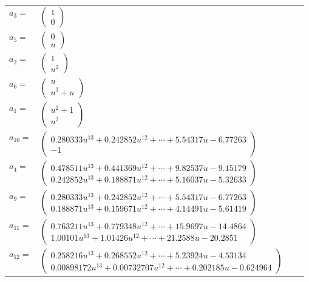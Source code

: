 \documentclass[1p]{elsarticle_modified}
\theoremstyle{definition}
\begin{document}
\begin{tabular}{m{7pt} m{180pt} m{7pt} m{180pt} }
\flushright $a_{3}=$&$\begin{pmatrix}1\\0\end{pmatrix}$ \\
\flushright $a_{5}=$&$\begin{pmatrix}0\\u\end{pmatrix}$ \\
\flushright $a_{2}=$&$\begin{pmatrix}1\\u^2\end{pmatrix}$ \\
\flushright $a_{6}=$&$\begin{pmatrix}u\\u^3+u\end{pmatrix}$ \\
\flushright $a_{1}=$&$\begin{pmatrix}u^2+1\\u^2\end{pmatrix}$ \\
\flushright $a_{10}=$&$\begin{pmatrix}0.280333 u^{13}+0.242852 u^{12}+\cdots+5.54317 u-6.77263\\-1\end{pmatrix}$ \\
\flushright $a_{4}=$&$\begin{pmatrix}0.478511 u^{13}+0.441369 u^{12}+\cdots+9.82537 u-9.15179\\0.242852 u^{13}+0.188871 u^{12}+\cdots+5.16037 u-5.32633\end{pmatrix}$ \\
\flushright $a_{9}=$&$\begin{pmatrix}0.280333 u^{13}+0.242852 u^{12}+\cdots+5.54317 u-6.77263\\0.188871 u^{13}+0.159671 u^{12}+\cdots+4.14491 u-5.61419\end{pmatrix}$ \\
\flushright $a_{11}=$&$\begin{pmatrix}0.763211 u^{13}+0.779348 u^{12}+\cdots+15.9697 u-14.4864\\1.00101 u^{13}+1.01426 u^{12}+\cdots+21.2588 u-20.2851\end{pmatrix}$ \\
\flushright $a_{12}=$&$\begin{pmatrix}0.258216 u^{13}+0.268552 u^{12}+\cdots+5.23924 u-4.53134\\0.00898172 u^{13}+0.00732707 u^{12}+\cdots+0.202185 u-0.624964\end{pmatrix}$ \\

\end{tabular}
\end{document}
